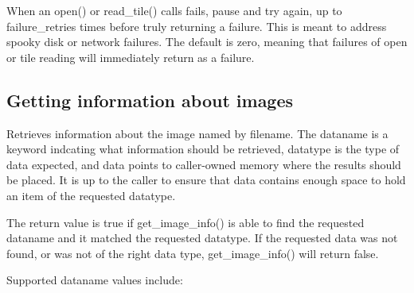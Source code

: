 When an {\cf open()} or {\cf read_tile()} calls fails, pause and try
again, up to {\cf failure_retries} times before truly returning a
failure.  This is meant to address spooky disk or network failures.  The
default is zero, meaning that failures of open or tile reading will
immediately return as a failure.
\apiend

\bigskip

\subsection{Getting information about images}
\label{sec:imagecache:api:getimageinfo}
\label{sec:imagecache:api:getimagespec}

Retrieves information about the image named by {\cf filename}.
The {\cf dataname} is a keyword indcating what information should
be retrieved, {\cf datatype} is the type of data expected, and
{\cf data} points to caller-owned memory where the results should be
placed.  It is up to the caller to ensure that {\cf data} contains
enough space to hold an item of the requested {\cf datatype}.

The return value is {\cf true} if {\cf get_image_info()} is able
to find the requested {\cf dataname} and it matched the requested
{\cf datatype}.  If the requested data was not found, or was not
of the right data type, {\cf get_image_info()} will return {\cf false}.

Supported {\cf dataname} values include:

